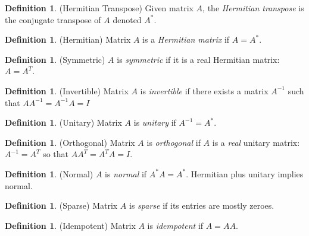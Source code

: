 \documentclass[12pt]{article}
\numberwithin{equation}{section} %
\theoremstyle{plain}
\theoremstyle{definition}
\newtheorem{defn}[thm]{Definition}
\theoremstyle{remark}
\begin{document}
\begin{defn}{(Hermitian Transpose)}
Given matrix $A$, the \emph{Hermitian transpose} is the conjugate
transpose of $A$ denoted $A^*$.
\end{defn}

\begin{defn}{(Hermitian)}
Matrix $A$ is a \emph{Hermitian matrix} if $A=A^*$.
\end{defn}

\begin{defn}{(Symmetric)}
$A$ is \emph{symmetric} if it is a real Hermitian matrix:
$A=A^T$.
\end{defn}

\begin{defn}{(Invertible)}
Matrix $A$ is \emph{invertible} if there exists a matrix $A^{-1}$ such
that $A A^{-1} = A^{-1}A=I$
\end{defn}

\begin{defn}{(Unitary)}
Matrix $A$ is \emph{unitary} if $A^{-1} = A^*$.
\end{defn}

\begin{defn}{(Orthogonal)}
Matrix $A$ is \emph{orthogonal} if $A$ is a \emph{real} unitary matrix:
$A^{-1} = A^T$ so that $AA^T = A^T A = I$.
\end{defn}

\begin{defn}{(Normal)}
$A$ is \emph{normal} if $A^* A = A^*$. Hermitian plus unitary
implies normal.
\end{defn}

\begin{defn}{(Sparse)}
Matrix $A$ is \emph{sparse} if its entries are mostly zeroes.
\end{defn}

\begin{defn}(Idempotent)
Matrix $A$ is \emph{idempotent} if $A = AA$.
\end{defn}
\end{document}
